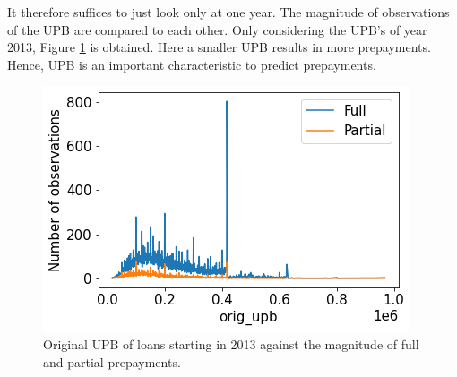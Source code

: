         It therefore suffices to just look only at one year. The 
        magnitude of observations of the UPB are compared to each
        other. Only considering the UPB's of year 2013, Figure 
        \ref{model_UPB_against_prepayment} is obtained. Here a
        smaller UPB results in more prepayments. Hence, UPB is an 
        important characteristic to predict prepayments. 
        \begin{figure}[H]
            \centering
            \includegraphics[width=0.6\linewidth]{Figures/UPB againts Full and Partial prepayments.png}
            \caption{Original UPB of loans starting in 2013 against the magnitude of full and partial prepayments.}
            \label{model_UPB_against_prepayment}
        \end{figure}


